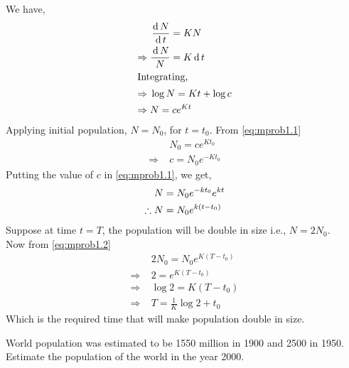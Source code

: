 \documentclass[../main-sheet.tex]{subfiles}
\begin{document}
\begin{soln}
    We have,
    \begin{align}
        &\,\frac{\mathrm{d}\,N}{\mathrm{d}\,t}=KN\notag\\
        \Rightarrow\;&\frac{\,\mathrm{d}\, N}{N}=K\,\mathrm{d}\, t\notag\\
        \intertext{Integrating,}
        \Rightarrow\;&\log N=Kt+\log c\notag\\
        \Rightarrow\;&N=ce^{Kt}\label{eq:mprob1.1}
    \end{align}
    Applying initial population, \(N=N_0\), for \(t=t_0\). From \eqref{eq:mprob1.1}
    \begin{align*}
        &N_0=ce^{Kt_0}\\
        \Rightarrow\;&c=N_0e^{-Kt_0}
    \end{align*}
    Putting the value of \(c\) in \eqref{eq:mprob1.1}, we get,
    \begin{align}
        &N=N_0e^{-kt_0}e^{kt}\notag\\
        \therefore\;&N=N_0e^{k(t-t_0)}\label{eq:mprob1.2}
    \end{align}
    Suppose at time \(t=T\), the population will be double in size i.e., \(N=2N_0\).\\
    Now from \eqref{eq:mprob1.2}
    \begin{align*}
        &2N_0=N_0e^{K(T-t_0)}\\
        \Rightarrow\;&2=e^{K(T-t_0)}\\
        \Rightarrow\;&\log 2={K(T-t_0)}\\
        \Rightarrow\;&T=\frac{1}{K}\log 2+t_0
    \end{align*}
    Which is the required time that will make population double in size.
\end{soln}
\begin{prob}
    World population was estimated to be 1550 million in 1900 and 2500 in 1950. Estimate the population of the world in the year 2000.
\end{prob}
\end{document}
